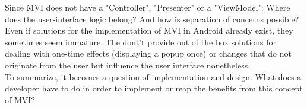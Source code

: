 Since MVI does not have a "Controller", "Presenter" or a "ViewModel": Where does the user-interface logic belong? And how is separation of concerns possible?
\\
Even if solutions for the implementation of MVI in Android already exist, they sometimes seem immature. The dont't provide out of the box solutions for dealing 
with one-time effects (displaying a popup once) or changes that do not originate from the user but influence the user interface nonetheless. 
\\
To summarize, it becomes a question of implementation and design. What does a developer have to do in order to implement or reap the benefits from this concept of MVI?




